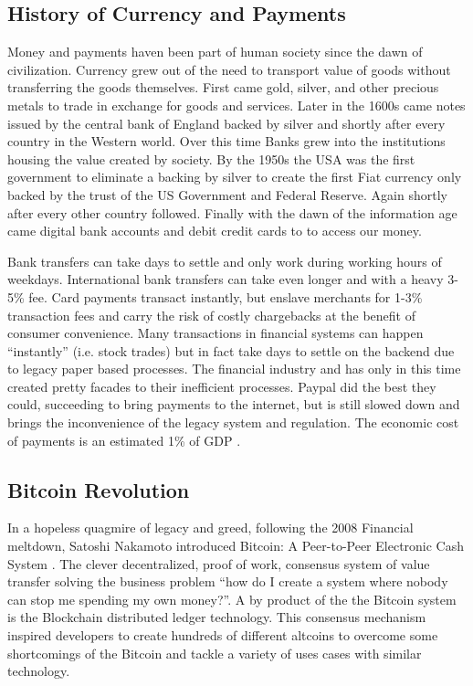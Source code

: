 \documentclass[12pt]{article} %
\begin{document}
\subsection{History of Currency and Payments}
Money and payments haven been part of human society since the dawn of civilization. Currency grew out of the need to transport value of goods without transferring the goods themselves. First came gold, silver, and other precious metals to trade in exchange for goods and services. Later in the 1600s came notes issued by the central bank of England backed by silver and shortly after every country in the Western world. Over this time Banks grew into the institutions housing the value created by society. By the 1950s the USA was the first government to eliminate a backing by silver to create the first Fiat currency only backed by the trust of the US Government and Federal Reserve. Again shortly after every other country followed. Finally with the dawn of the information age came digital bank accounts and debit credit cards to to access our money. 

Bank transfers can take days to settle and only work during working hours of weekdays. International bank transfers can take even longer and with a heavy 3-5\% fee. Card payments transact instantly, but enslave merchants for 1-3\% transaction fees and carry the risk of costly chargebacks at the benefit of consumer convenience. Many transactions in financial systems can happen ``instantly'' (i.e. stock trades) but in fact take days to settle on the backend due to legacy paper based processes. The financial industry and has only in this time created pretty facades to their inefficient processes. Paypal did the best they could, succeeding to bring payments to the internet, but is still slowed down and brings the inconvenience of the legacy system and regulation. The economic cost of payments is an estimated 1\% of GDP .

\subsection{Bitcoin Revolution}
In a hopeless quagmire of legacy and greed, following the 2008 Financial meltdown, Satoshi Nakamoto introduced Bitcoin: A Peer-to-Peer Electronic Cash System . The clever decentralized, proof of work, consensus system of value transfer solving the business problem ``how do I create a system where nobody can stop me spending my own money?''. A by product of the the Bitcoin system is the Blockchain distributed ledger technology. This consensus mechanism inspired developers to create hundreds of different altcoins to overcome some shortcomings of the Bitcoin and tackle a variety of uses cases with similar technology.
\end{document}
